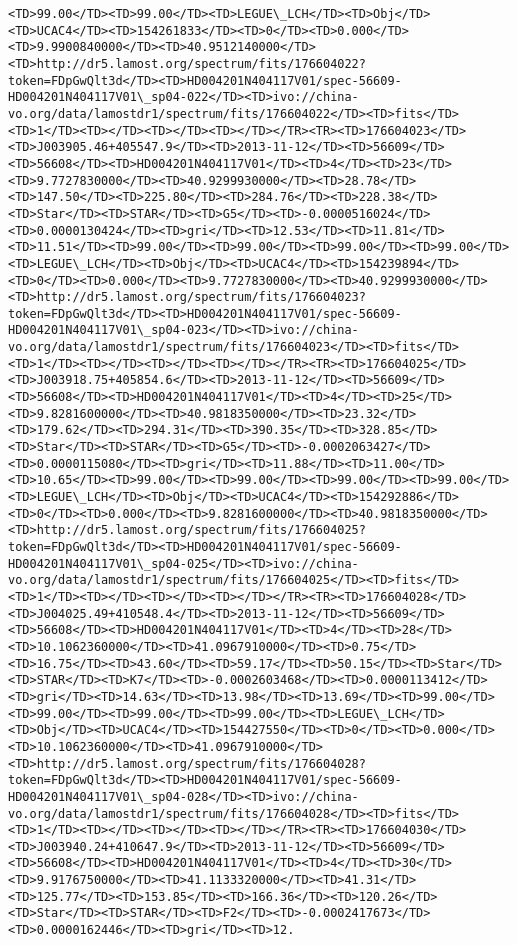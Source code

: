 \documentclass[11pt]{article}
\begin{document}
\begin{Verbatim}[commandchars=\\\{\}]
<TD>99.00</TD><TD>99.00</TD><TD>LEGUE\_LCH</TD><TD>Obj</TD><TD>UCAC4</TD><TD>154261833</TD><TD>0</TD><TD>0.000</TD><TD>9.9900840000</TD><TD>40.9512140000</TD><TD>http://dr5.lamost.org/spectrum/fits/176604022?token=FDpGwQlt3d</TD><TD>HD004201N404117V01/spec-56609-HD004201N404117V01\_sp04-022</TD><TD>ivo://china-vo.org/data/lamostdr1/spectrum/fits/176604022</TD><TD>fits</TD><TD>1</TD><TD></TD><TD></TD><TD></TD></TR><TR><TD>176604023</TD><TD>J003905.46+405547.9</TD><TD>2013-11-12</TD><TD>56609</TD><TD>56608</TD><TD>HD004201N404117V01</TD><TD>4</TD><TD>23</TD><TD>9.7727830000</TD><TD>40.9299930000</TD><TD>28.78</TD><TD>147.50</TD><TD>225.80</TD><TD>284.76</TD><TD>228.38</TD><TD>Star</TD><TD>STAR</TD><TD>G5</TD><TD>-0.0000516024</TD><TD>0.0000130424</TD><TD>gri</TD><TD>12.53</TD><TD>11.81</TD><TD>11.51</TD><TD>99.00</TD><TD>99.00</TD><TD>99.00</TD><TD>99.00</TD><TD>LEGUE\_LCH</TD><TD>Obj</TD><TD>UCAC4</TD><TD>154239894</TD><TD>0</TD><TD>0.000</TD><TD>9.7727830000</TD><TD>40.9299930000</TD><TD>http://dr5.lamost.org/spectrum/fits/176604023?token=FDpGwQlt3d</TD><TD>HD004201N404117V01/spec-56609-HD004201N404117V01\_sp04-023</TD><TD>ivo://china-vo.org/data/lamostdr1/spectrum/fits/176604023</TD><TD>fits</TD><TD>1</TD><TD></TD><TD></TD><TD></TD></TR><TR><TD>176604025</TD><TD>J003918.75+405854.6</TD><TD>2013-11-12</TD><TD>56609</TD><TD>56608</TD><TD>HD004201N404117V01</TD><TD>4</TD><TD>25</TD><TD>9.8281600000</TD><TD>40.9818350000</TD><TD>23.32</TD><TD>179.62</TD><TD>294.31</TD><TD>390.35</TD><TD>328.85</TD><TD>Star</TD><TD>STAR</TD><TD>G5</TD><TD>-0.0002063427</TD><TD>0.0000115080</TD><TD>gri</TD><TD>11.88</TD><TD>11.00</TD><TD>10.65</TD><TD>99.00</TD><TD>99.00</TD><TD>99.00</TD><TD>99.00</TD><TD>LEGUE\_LCH</TD><TD>Obj</TD><TD>UCAC4</TD><TD>154292886</TD><TD>0</TD><TD>0.000</TD><TD>9.8281600000</TD><TD>40.9818350000</TD><TD>http://dr5.lamost.org/spectrum/fits/176604025?token=FDpGwQlt3d</TD><TD>HD004201N404117V01/spec-56609-HD004201N404117V01\_sp04-025</TD><TD>ivo://china-vo.org/data/lamostdr1/spectrum/fits/176604025</TD><TD>fits</TD><TD>1</TD><TD></TD><TD></TD><TD></TD></TR><TR><TD>176604028</TD><TD>J004025.49+410548.4</TD><TD>2013-11-12</TD><TD>56609</TD><TD>56608</TD><TD>HD004201N404117V01</TD><TD>4</TD><TD>28</TD><TD>10.1062360000</TD><TD>41.0967910000</TD><TD>0.75</TD><TD>16.75</TD><TD>43.60</TD><TD>59.17</TD><TD>50.15</TD><TD>Star</TD><TD>STAR</TD><TD>K7</TD><TD>-0.0002603468</TD><TD>0.0000113412</TD><TD>gri</TD><TD>14.63</TD><TD>13.98</TD><TD>13.69</TD><TD>99.00</TD><TD>99.00</TD><TD>99.00</TD><TD>99.00</TD><TD>LEGUE\_LCH</TD><TD>Obj</TD><TD>UCAC4</TD><TD>154427550</TD><TD>0</TD><TD>0.000</TD><TD>10.1062360000</TD><TD>41.0967910000</TD><TD>http://dr5.lamost.org/spectrum/fits/176604028?token=FDpGwQlt3d</TD><TD>HD004201N404117V01/spec-56609-HD004201N404117V01\_sp04-028</TD><TD>ivo://china-vo.org/data/lamostdr1/spectrum/fits/176604028</TD><TD>fits</TD><TD>1</TD><TD></TD><TD></TD><TD></TD></TR><TR><TD>176604030</TD><TD>J003940.24+410647.9</TD><TD>2013-11-12</TD><TD>56609</TD><TD>56608</TD><TD>HD004201N404117V01</TD><TD>4</TD><TD>30</TD><TD>9.9176750000</TD><TD>41.1133320000</TD><TD>41.31</TD><TD>125.77</TD><TD>153.85</TD><TD>166.36</TD><TD>120.26</TD><TD>Star</TD><TD>STAR</TD><TD>F2</TD><TD>-0.0002417673</TD><TD>0.0000162446</TD><TD>gri</TD><TD>12.
\end{Verbatim}
\end{document}
